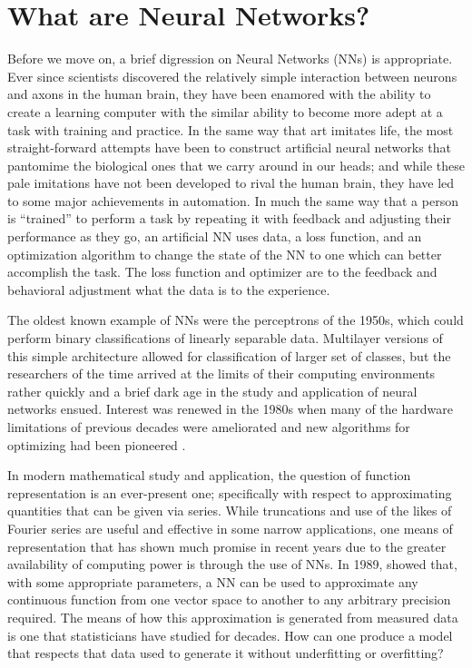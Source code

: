 \section{What are Neural Networks?}

Before we move on, a brief digression on Neural Networks (NNs) is appropriate. Ever since
scientists discovered the relatively simple interaction between neurons and axons in 
the human brain, they have been enamored with the ability to create a learning computer 
with the similar ability to become more adept at a task with training and practice. 
In the same way that art imitates life, the most straight-forward attempts have been 
to construct artificial neural networks that pantomime the biological ones that we carry 
around in our heads; and while these pale imitations have not been developed to rival the 
human brain, they have led to some major achievements in automation. In much the same 
way that a person is ``trained'' to perform a task by repeating it with feedback and 
adjusting their performance as they go, an artificial NN uses data, a loss function, and 
an optimization algorithm to change the state of the NN to one which can better accomplish 
the task. The loss function and optimizer are to the feedback and behavioral adjustment 
what the data is to the experience. 

The oldest known example 
of NNs were the perceptrons of the 1950s, which could perform binary classifications of 
linearly separable data. Multilayer versions of this simple architecture allowed for 
classification of larger set of classes, but the researchers of the time arrived at the 
limits of their computing environments rather quickly and a brief dark age in the study 
and application of neural networks ensued. Interest was renewed in the 1980s when many 
of the hardware limitations of previous decades were ameliorated and new algorithms for 
optimizing had been pioneered \cite{rumelhart}.

In modern mathematical study and application, the question of function representation is
an ever-present one; specifically with respect to approximating quantities that can be 
given via series. While truncations and use of the likes of Fourier series are useful and 
effective in some narrow applications, one means of representation that has shown much 
promise in recent years due to the greater availability of computing power is through 
the use of NNs. In 1989, \cite{hornik} showed that, with some appropriate
parameters, a NN can be used to approximate any continuous function from one vector space 
to another to any arbitrary precision required. The means of how this approximation is 
generated from measured data is one that statisticians have studied for decades. How can 
one produce a model that respects that data used to generate it without underfitting or 
overfitting?

